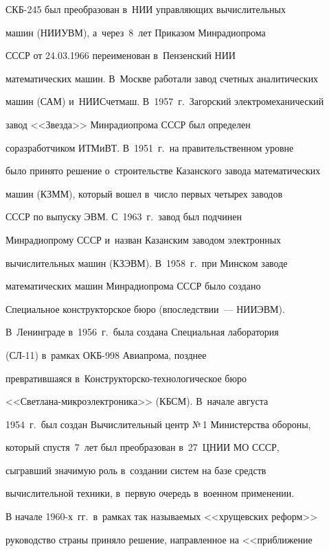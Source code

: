 \mbox{СКБ-245} был преобразован в~НИИ управ\-ля\-ющих вы\-чис\-ли\-тель\-ных 

машин (\mbox{НИИУВМ}), а~через~8~лет Приказом Минрадиопрома 

\mbox{СССР} от 24.03.1966 переименован в~Пензенский НИИ 

математических машин. В~Москве работали завод счет\-ных аналитических 

машин (САМ) и~\mbox{НИИСчетмаш}. В~1957~г.\ Загорский электромеханический 

завод <<Звезда>> Минрадиопрома \mbox{СССР} был определен 

соразработчиком \mbox{ИТМиВТ}. В~1951~г.\ на правительственном уровне 

было принято решение о~строительстве Казанского завода математических 

машин (\mbox{КЗММ}), который вошел в~чис\-ло пер\-вых четырех заводов 

\mbox{СССР} по выпуску ЭВМ. С~1963~г.\ завод был подчинен 

Минрадиопрому \mbox{СССР} и~назван Казанским заводом электронных 

вычислительных машин (\mbox{КЗЭВМ}). В~1958~г.\ при Минском заводе 

математических машин Минрадиопрома \mbox{СССР} было создано 

Специальное конструкторское бюро (впоследствии~--- \mbox{НИИЭВМ}). 

В~Ленинграде в~1956~г.\ была создана Специальная лаборатория 

(\mbox{СЛ-11}) в~рамках \mbox{ОКБ-998} Авиапрома, позд\-нее 

превратившаяся в~Кон\-ст\-рук\-тор\-ско-тех\-но\-ло\-ги\-че\-ское бюро 

<<Свет\-ла\-на-мик\-ро\-элект\-ро\-ни\-ка>> (КБСМ). В~начале августа 

1954~г.\ был создан Вы\-чис\-ли\-тель\-ный центр №\,1 Министерства обороны, 

который спустя~7~лет был преобразован в~27~ЦНИИ МО \mbox{СССР}, 

сыграв\-ший значимую роль в~создании сис\-тем на базе средств 

вы\-чис\-ли\-тель\-ной техники, в~первую очередь в~военном применении.

   

   В начале 1960-х~гг.\ в~рамках так называемых <<хрущевских реформ>> 

руководство страны приняло решение, на\-прав\-лен\-ное на <<при\-бли\-же\-ние 

